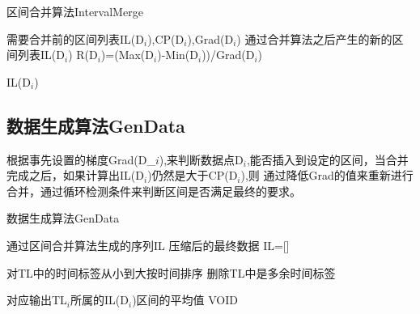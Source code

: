 \begin{algorithm}
\caption{区间合并算法IntervalMerge}
\label{alg2}
\begin{algorithmic}[1]
\REQUIRE 需要合并前的区间列表IL(D$_{i}$),CP(D$_{i}$),Grad(D$_{i}$) 
\ENSURE 通过合并算法之后产生的新的区间列表IL(D$_{i}$)
\STATE  R(D$_{i}$)=(Max(D$_{i}$)-Min(D$_{i}$))/Grad(D$_{i}$)
\ENDFOR

\ENDWHILE
\RETURN IL(D$_{i}$)
\end{algorithmic}
\end{algorithm}


\subsection{数据生成算法GenData}
\label{section 4.16}

根据事先设置的梯度Grad(D_${i}$),来判断数据点D$_{i}$,能否插入到设定的区间，当合并完成之后，如果计算出IL(D$_{i}$)仍然是大于CP(D$_{i}$),则
通过降低Grad的值来重新进行合并，通过循环检测条件来判断区间是否满足最终的要求。


\begin{algorithm}
\caption{数据生成算法GenData}
\label{alg3}
\begin{algorithmic}[1]
\REQUIRE 通过区间合并算法生成的序列IL
\ENSURE 压缩后的最终数据
\STATE IL=[]
\ENDFOR

\STATE 对TL中的时间标签从小到大按时间排序
\STATE 删除TL中是多余时间标签

	\STATE 对应输出TL$_{i}$所属的IL(D$_{i}$)区间的平均值
\ENDFOR
\RETURN VOID
\end{algorithmic}
\end{algorithm}

